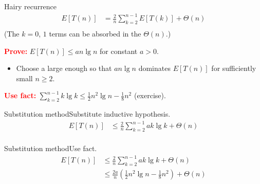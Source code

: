 \documentclass{beamer}
\begin{document}
\begin{frame}{Hairy recurrence}
    \begin{equation*}
        \begin{split}
        E[T(n)] &= \frac{2}{n}\sum\limits_{k=2}^{n-1} E[T(k)] + \Theta(n) \\
        \end{split}
    \end{equation*}
    (The $k = 0$, $1$ terms can be absorbed in the $\Theta(n)$.)
    \begin{alertblock}{\textcolor{red}{\textbf{Prove:}}}
        $E[T(n)] \leq a n \lg n$ for constant $a > 0$.
    \end{alertblock}
    \begin{itemize}
        \item Choose a large enough so that $a n \lg n$ dominates $E[T(n)]$ for sufficiently small $n \geq 2$.
    \end{itemize}
    \begin{alertblock}{\textcolor{red}{\textbf{Use fact:}}}
        $\sum\limits_{k=2}^{n-1} k \lg k \leq \frac{1}{2} n^2 \lg n - \frac{1}{8} n^2$ (exercise).
    \end{alertblock}
\end{frame}

\begin{frame}{Substitution method}{Substitute inductive hypothesis.}
    \begin{equation*}
        \begin{split}
        E[T(n)] &\leq \frac{2}{n}\sum\limits_{k=2}^{n-1} a k \lg k + \Theta(n) \\
        \end{split}
    \end{equation*}
\end{frame}

\begin{frame}{Substitution method}{Use fact.}
    \begin{equation*}
        \begin{split}
        E[T(n)] &\leq \frac{2}{n}\sum\limits_{k=2}^{n-1} a k \lg k + \Theta(n) \\
                &\leq \frac{2a}{n} \left( \frac{1}{2}n^2 \lg n - \frac{1}{8}n^2 \right) + \Theta(n) \\
        \end{split}
    \end{equation*}
\end{frame}
\end{document}

